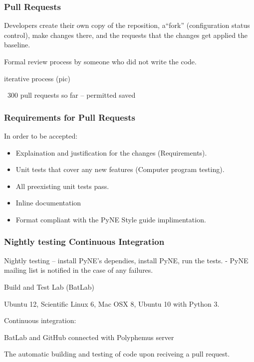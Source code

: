 \documentclass[12pt]{beamer}
\begin{document}
\begin{frame}
\frametitle{Pull Requests}

Developers create their own copy of the reposition, a``fork''
(\alert{configuration status control}), make changes there, and the requests
that the changes get applied the baseline.

Formal review process by someone who did not write the code.

iterative process (pic)

~300 pull requests so far -- permitted saved 



\end{frame}

\begin{frame}
\frametitle{Requirements for Pull Requests}
In order to be accepted:
\begin{itemize}
\item{Explaination and justification for the changes (\alert{Requirements}).}
\item{Unit tests that cover any new features (\alert{Computer program testing}).}
\item{All preexisting unit tests pass.}
\item{Inline documentation}
\item{Format compliant with the PyNE Style guide \alert{implimentation}.}
\end{itemize}

\end{frame}



\begin{frame}
\frametitle{Nightly testing Continuous Integration}

Nightly testing -- install PyNE's dependies, install PyNE, run the tests.
- PyNE mailing list is notified in the case of any failures.

Build and Test Lab (BatLab)

Ubuntu 12, Scientific Linux 6, Mac OSX 8, Ubuntu 10 with Python 3.

Continuous integration:

BatLab and GitHub connected with Polyphemus server


The automatic building and testing of code upon reciveing a pull request.

\cite{beck1998extreme}
\cite{batlab_2014}
\cite{polyphemus_2014}

\end{frame}
\end{document}
